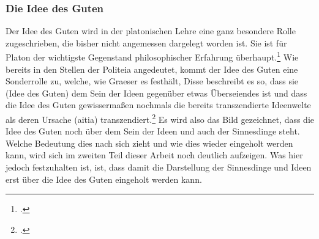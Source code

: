 \subsubsection*{Die Idee des Guten}
Der Idee des Guten wird in der platonischen Lehre eine ganz besondere Rolle zugeschrieben, die bisher nicht angemessen dargelegt worden ist. Sie ist für Platon der wichtigste Gegenstand philosophischer Erfahrung überhaupt.\footcite[vgl.][S. 158]{GraeserPhiloGeschichte}
Wie bereits in den Stellen der Politeia angedeutet, kommt der Idee des Guten eine Sonderrolle zu, welche, wie Graeser es festhält, 
Disse beschreibt es so, dass sie (Idee des Guten) dem Sein der Ideen gegenüber etwas Überseiendes ist und dass die Idee des Guten gewissermaßen nochmals die bereits transzendierte Ideenwelte als deren Ursache (aitia) transzendiert.\footcite[vgl.][S. 50]{DisseMetaphysik}
Es wird also das Bild gezeichnet, dass die Idee des Guten noch über dem Sein der Ideen und auch der Sinnesdinge steht. Welche Bedeutung dies nach sich zieht und wie dies wieder eingeholt werden kann, wird sich im zweiten Teil dieser Arbeit noch deutlich aufzeigen. Was hier jedoch festzuhalten ist, ist, dass damit die Darstellung der Sinnesdinge und Ideen erst über die Idee des Guten eingeholt werden kann. 

